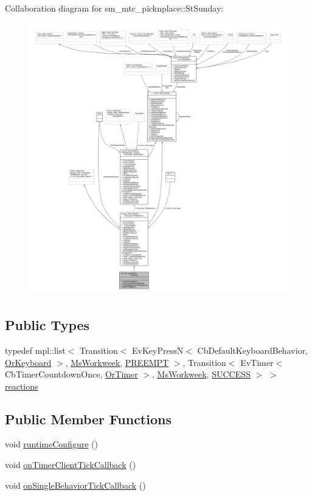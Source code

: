 Collaboration diagram for sm\+\_\+mtc\+\_\+picknplace\+:\+:St\+Sunday\+:
\nopagebreak
\begin{figure}[H]
\begin{center}
\leavevmode
\includegraphics[width=350pt]{structsm__mtc__picknplace_1_1StSunday__coll__graph}
\end{center}
\end{figure}
\subsection*{Public Types}
\begin{DoxyCompactItemize}
\item 
typedef mpl\+::list$<$ Transition$<$ Ev\+Key\+PressN$<$ Cb\+Default\+Keyboard\+Behavior, \hyperlink{classsm__mtc__picknplace_1_1OrKeyboard}{Or\+Keyboard} $>$, \hyperlink{classsm__mtc__picknplace_1_1MsWorkweek}{Ms\+Workweek}, \hyperlink{classPREEMPT}{P\+R\+E\+E\+M\+PT} $>$, Transition$<$ Ev\+Timer$<$ Cb\+Timer\+Countdown\+Once, \hyperlink{classsm__mtc__picknplace_1_1OrTimer}{Or\+Timer} $>$, \hyperlink{classsm__mtc__picknplace_1_1MsWorkweek}{Ms\+Workweek}, \hyperlink{classSUCCESS}{S\+U\+C\+C\+E\+SS} $>$ $>$ \hyperlink{structsm__mtc__picknplace_1_1StSunday_af680bd1949980af99c6ac5abea3102e7}{reactions}
\end{DoxyCompactItemize}
\subsection*{Public Member Functions}
\begin{DoxyCompactItemize}
\item 
void \hyperlink{structsm__mtc__picknplace_1_1StSunday_aeb7d6ba235ed9dea811e8f3d74fa2761}{runtime\+Configure} ()
\item 
void \hyperlink{structsm__mtc__picknplace_1_1StSunday_aa57866d660aeadd41beb5238f54ad443}{on\+Timer\+Client\+Tick\+Callback} ()
\item 
void \hyperlink{structsm__mtc__picknplace_1_1StSunday_add7dcdb2cfe2e2aa87aa928df46bcf4a}{on\+Single\+Behavior\+Tick\+Callback} ()
\end{DoxyCompactItemize}
